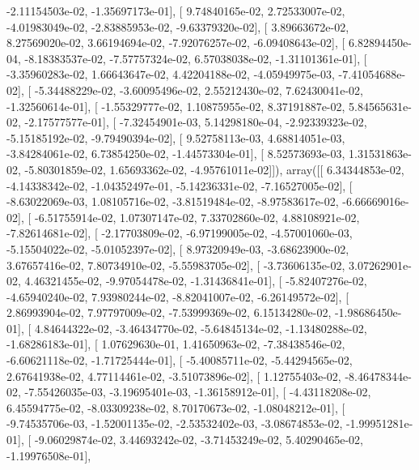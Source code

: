 \documentclass{article}
\begin{document}
         -2.11154503e-02,  -1.35697173e-01],
       [  9.74840165e-02,   2.72533007e-02,  -4.01983049e-02,
         -2.83885953e-02,  -9.63379320e-02],
       [  3.89663672e-02,   8.27569020e-02,   3.66194694e-02,
         -7.92076257e-02,  -6.09408643e-02],
       [  6.82894450e-04,  -8.18383537e-02,  -7.57757324e-02,
          6.57038038e-02,  -1.31101361e-01],
       [ -3.35960283e-02,   1.66643647e-02,   4.42204188e-02,
         -4.05949975e-03,  -7.41054688e-02],
       [ -5.34488229e-02,  -3.60095496e-02,   2.55212430e-02,
          7.62430041e-02,  -1.32560614e-01],
       [ -1.55329777e-02,   1.10875955e-02,   8.37191887e-02,
          5.84565631e-02,  -2.17577577e-01],
       [ -7.32454901e-03,   5.14298180e-04,  -2.92339323e-02,
         -5.15185192e-02,  -9.79490394e-02],
       [  9.52758113e-03,   4.68814051e-03,  -3.84284061e-02,
          6.73854250e-02,  -1.44573304e-01],
       [  8.52573693e-03,   1.31531863e-02,  -5.80301859e-02,
          1.65693362e-02,  -4.95761011e-02]]), array([[  6.34344853e-02,  -4.14338342e-02,  -1.04352497e-01,
         -5.14236331e-02,  -7.16527005e-02],
       [ -8.63022069e-03,   1.08105716e-02,  -3.81519484e-02,
         -8.97583617e-02,  -6.66669016e-02],
       [ -6.51755914e-02,   1.07307147e-02,   7.33702860e-02,
          4.88108921e-02,  -7.82614681e-02],
       [ -2.17703809e-02,  -6.97199005e-02,  -4.57001060e-03,
         -5.15504022e-02,  -5.01052397e-02],
       [  8.97320949e-03,  -3.68623900e-02,   3.67657416e-02,
          7.80734910e-02,  -5.55983705e-02],
       [ -3.73606135e-02,   3.07262901e-02,   4.46321455e-02,
         -9.97054478e-02,  -1.31436841e-01],
       [ -5.82407276e-02,  -4.65940240e-02,   7.93980244e-02,
         -8.82041007e-02,  -6.26149572e-02],
       [  2.86993904e-02,   7.97797009e-02,  -7.53999369e-02,
          6.15134280e-02,  -1.98686450e-01],
       [  4.84644322e-02,  -3.46434770e-02,  -5.64845134e-02,
         -1.13480288e-02,  -1.68286183e-01],
       [  1.07629630e-01,   1.41650963e-02,  -7.38438546e-02,
         -6.60621118e-02,  -1.71725444e-01],
       [ -5.40085711e-02,  -5.44294565e-02,   2.67641938e-02,
          4.77114461e-02,  -3.51073896e-02],
       [  1.12755403e-02,  -8.46478344e-02,  -7.55426035e-03,
         -3.19695401e-03,  -1.36158912e-01],
       [ -4.43118208e-02,   6.45594775e-02,  -8.03309238e-02,
          8.70170673e-02,  -1.08048212e-01],
       [ -9.74535706e-03,  -1.52001135e-02,  -2.53532402e-03,
         -3.08674853e-02,  -1.99951281e-01],
       [ -9.06029874e-02,   3.44693242e-02,  -3.71453249e-02,
          5.40290465e-02,  -1.19976508e-01],
\end{document}
